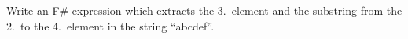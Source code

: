 Write an F\#-expression which extracts the 3.\ element and the substring from the 2.\ to the 4.\ element in the string ``abcdef''.